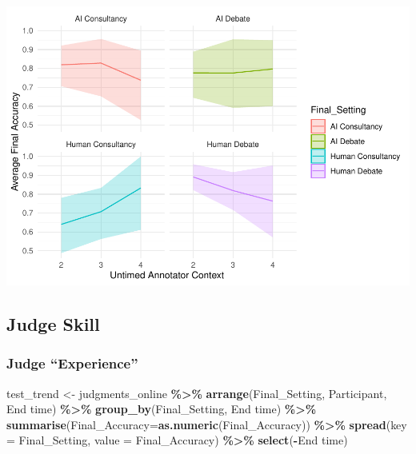 \documentclass[
]{article}
\newenvironment{Shaded}{\begin{snugshade}}{\end{snugshade}}
\newcommand{\AttributeTok}[1]{\textcolor[rgb]{0.13,0.29,0.53}{#1}}
\newcommand{\FunctionTok}[1]{\textcolor[rgb]{0.13,0.29,0.53}{\textbf{#1}}}
\newcommand{\NormalTok}[1]{#1}
\newcommand{\OtherTok}[1]{\textcolor[rgb]{0.56,0.35,0.01}{#1}}
\newcommand{\SpecialCharTok}[1]{\textcolor[rgb]{0.81,0.36,0.00}{\textbf{#1}}}
\newcommand{\StringTok}[1]{\textcolor[rgb]{0.31,0.60,0.02}{#1}}
\begin{document}
\includegraphics[width=1\linewidth]{debate-2309_files/figure-latex/Accuracy by Context Graph-3}

\subsection{Judge Skill}\label{judge-skill}

\subsubsection{Judge ``Experience''}\label{judge-experience}

\begin{Shaded}
\begin{Highlighting}[]
\NormalTok{test\_trend }\OtherTok{\textless{}{-}}\NormalTok{ judgments\_online }\SpecialCharTok{\%\textgreater{}\%}
  \FunctionTok{arrange}\NormalTok{(Final\_Setting, Participant, }\StringTok{\textasciigrave{}}\AttributeTok{End time}\StringTok{\textasciigrave{}}\NormalTok{) }\SpecialCharTok{\%\textgreater{}\%}
  \FunctionTok{group\_by}\NormalTok{(Final\_Setting, }\StringTok{\textasciigrave{}}\AttributeTok{End time}\StringTok{\textasciigrave{}}\NormalTok{) }\SpecialCharTok{\%\textgreater{}\%}
  \FunctionTok{summarise}\NormalTok{(}\AttributeTok{Final\_Accuracy=}\FunctionTok{as.numeric}\NormalTok{(Final\_Accuracy)) }\SpecialCharTok{\%\textgreater{}\%}
  \FunctionTok{spread}\NormalTok{(}\AttributeTok{key =}\NormalTok{ Final\_Setting, }\AttributeTok{value =}\NormalTok{ Final\_Accuracy) }\SpecialCharTok{\%\textgreater{}\%}
  \FunctionTok{select}\NormalTok{(}\SpecialCharTok{{-}}\StringTok{\textasciigrave{}}\AttributeTok{End time}\StringTok{\textasciigrave{}}\NormalTok{)}
\end{Highlighting}
\end{Shaded}
\end{document}
